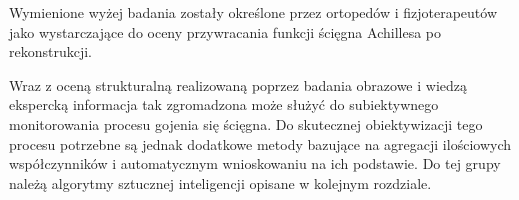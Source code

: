 Wymienione wyżej badania zostały określone przez ortopedów i fizjoterapeutów jako wystarczające do oceny przywracania funkcji ścięgna Achillesa po rekonstrukcji. 

Wraz z oceną strukturalną realizowaną poprzez badania obrazowe i wiedzą ekspercką informacja tak zgromadzona może służyć do subiektywnego monitorowania procesu gojenia się ścięgna. Do skutecznej obiektywizacji tego procesu potrzebne są jednak dodatkowe metody bazujące na agregacji ilościowych współczynników i automatycznym wnioskowaniu na ich podstawie. Do tej grupy należą algorytmy sztucznej inteligencji opisane w kolejnym rozdziale. 